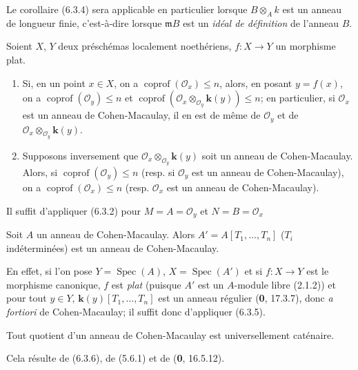 Le corollaire (6.3.4) sera applicable en particulier lorsque $B\otimes_Ak$ est
un anneau de longueur finie, c'est-à-dire lorsque $\mathfrak mB$ est un \emph{idéal
de définition} de l'anneau $B$.

\begin{corollary}[6.3.5]
\label{IV.2.s6.3.5-fr}
Soient $X$, $Y$ deux préschémas localement noethériens, $f:X\to Y$ un
morphisme plat.
\begin{enumerate}
\item[\textup{(i)}] Si, en un point $x\in X$, on a
$\operatorname{coprof}(\mathcal O_x)\leq n$, alors, en posant $y=f(x)$, on a
$\operatorname{coprof}(\mathcal O_y)\leq n$ et
$\operatorname{coprof}(\mathcal O_x\otimes_{\mathcal O_y}\boldsymbol{k}(y))\leq n$; en
particulier, si $\mathcal O_x$ est un anneau de Cohen-Macaulay, il en est de
même de $\mathcal O_y$ et de
$\mathcal O_x\otimes_{\mathcal O_y}\boldsymbol{k}(y)$.
\item[\textup{(ii)}] Supposons inversement que
$\mathcal O_x\otimes_{\mathcal O_y}\boldsymbol{k}(y)$ soit un anneau de Cohen-Macaulay.
Alors, si $\operatorname{coprof}(\mathcal O_y)\leq n$ \textup{(resp.} si
$\mathcal O_y$ est un anneau de Cohen-Macaulay), on a
$\operatorname{coprof}(\mathcal O_x)\leq n$ \textup{(resp.} $\mathcal O_x$ est un
anneau de Cohen-Macaulay).
\end{enumerate}
\end{corollary}

Il suffit d'appliquer (6.3.2) pour $M=A=\mathcal O_y$ et
$N=B=\mathcal O_x$

\begin{corollary}[6.3.6]
\label{IV.2.s6.3.6-fr}
Soit $A$ un anneau de Cohen-Macaulay. Alors
$A'=A[T_1,\ldots,T_n]$ ($T_i$ indéterminées) est un anneau de
Cohen-Macaulay.
\end{corollary}

En effet, si l'on pose $Y=\operatorname{Spec}(A)$,
$X=\operatorname{Spec}(A')$ et si $f:X\to Y$ est le morphisme canonique, $f$
est \emph{plat} (puisque $A'$ est un $A$-module libre (2.1.2)) et pour tout $y\in Y$,
$\boldsymbol{k}(y)[T_1,\ldots,T_n]$ est un anneau régulier (\textbf{0}, 17.3.7), donc \emph{a
fortiori} de Cohen-Macaulay; il suffit donc d'appliquer (6.3.5).

\begin{corollary}[6.3.7]
\label{IV.2.s6.3.7-fr}
Tout quotient d'un anneau de Cohen-Macaulay est universellement caténaire.
\end{corollary}

Cela résulte de (6.3.6), de (5.6.1) et de (\textbf{0}, 16.5.12).

